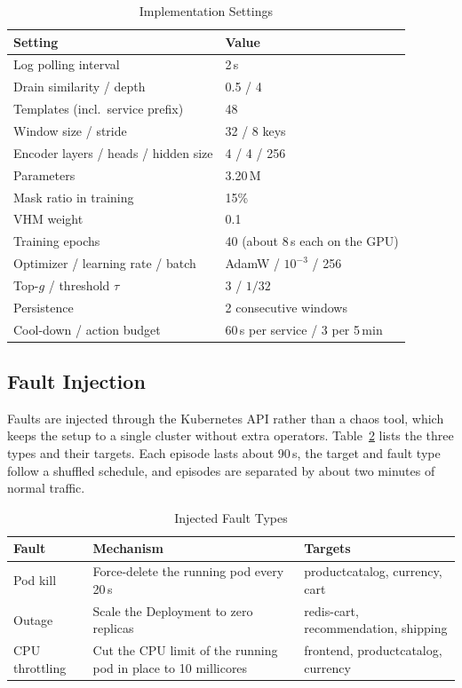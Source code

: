 \documentclass[journal]{IEEEtran}
\begin{document}
\begin{table}[!t]
\centering
\caption{Implementation Settings}
\label{tab:params}
\begin{tabular}{@{}ll@{}}
\toprule
Setting & Value \\
\midrule
Log polling interval & 2\,s \\
Drain similarity / depth & 0.5 / 4 \\
Templates (incl.\ service prefix) & 48 \\
Window size / stride & 32 / 8 keys \\
Encoder layers / heads / hidden size & 4 / 4 / 256 \\
Parameters & 3.20\,M \\
Mask ratio in training & 15\% \\
VHM weight & 0.1 \\
Training epochs & 40 (about 8\,s each on the GPU) \\
Optimizer / learning rate / batch & AdamW / $10^{-3}$ / 256 \\
Top-$g$ / threshold $\tau$ & 3 / $1/32$ \\
Persistence & 2 consecutive windows \\
Cool-down / action budget & 60\,s per service / 3 per 5\,min \\
\bottomrule
\end{tabular}
\end{table}

\subsection{Fault Injection}
Faults are injected through the Kubernetes API rather than a chaos tool, which keeps the setup to a single cluster without extra operators. Table~\ref{tab:faults} lists the three types and their targets. Each episode lasts about 90\,s, the target and fault type follow a shuffled schedule, and episodes are separated by about two minutes of normal traffic.

\begin{table}[!t]
\centering
\caption{Injected Fault Types}
\label{tab:faults}
\setlength{\tabcolsep}{3pt}
\begin{tabular}{@{}p{1.35cm}p{3.2cm}p{3.6cm}@{}}
\toprule
Fault & Mechanism & Targets \\
\midrule
Pod kill & Force-delete the running pod every 20\,s & productcatalog, currency, cart \\
Outage & Scale the Deployment to zero replicas & redis-cart, recommendation, shipping \\
CPU throttling & Cut the CPU limit of the running pod in place to 10 millicores & frontend, productcatalog, currency \\
\bottomrule
\end{tabular}
\end{table}
\end{document}
